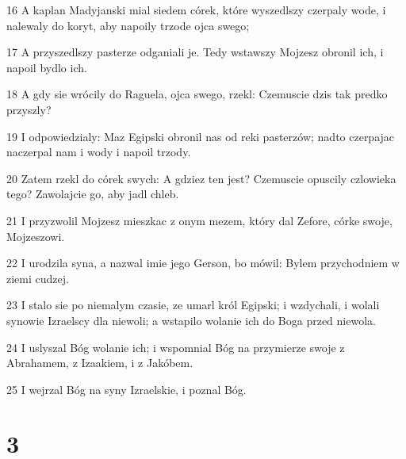 \par 16 A kaplan Madyjanski mial siedem córek, które wyszedlszy czerpaly wode, i nalewaly do koryt, aby napoily trzode ojca swego;
\par 17 A przyszedlszy pasterze odganiali je. Tedy wstawszy Mojzesz obronil ich, i napoil bydlo ich.
\par 18 A gdy sie wrócily do Raguela, ojca swego, rzekl: Czemuscie dzis tak predko przyszly?
\par 19 I odpowiedzialy: Maz Egipski obronil nas od reki pasterzów; nadto czerpajac naczerpal nam i wody i napoil trzody.
\par 20 Zatem rzekl do córek swych: A gdziez ten jest? Czemuscie opuscily czlowieka tego? Zawolajcie go, aby jadl chleb.
\par 21 I przyzwolil Mojzesz mieszkac z onym mezem, który dal Zefore, córke swoje, Mojzeszowi.
\par 22 I urodzila syna, a nazwal imie jego Gerson, bo mówil: Bylem przychodniem w ziemi cudzej.
\par 23 I stalo sie po niemalym czasie, ze umarl król Egipski; i wzdychali, i wolali synowie Izraelscy dla niewoli; a wstapilo wolanie ich do Boga przed niewola.
\par 24 I uslyszal Bóg wolanie ich; i wspomnial Bóg na przymierze swoje z Abrahamem, z Izaakiem, i z Jakóbem.
\par 25 I wejrzal Bóg na syny Izraelskie, i poznal Bóg.

\chapter{3}

